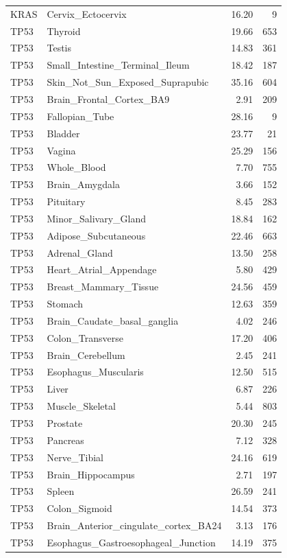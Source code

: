 \begin{footnotesize}
\begin{longtable}{llrr}
KRAS & Cervix\_Ectocervix & 16.20 & 9 \\
TP53 & Thyroid & 19.66 & 653 \\
TP53 & Testis & 14.83 & 361 \\
TP53 & Small\_Intestine\_Terminal\_Ileum & 18.42 & 187 \\
TP53 & Skin\_Not\_Sun\_Exposed\_Suprapubic & 35.16 & 604 \\
TP53 & Brain\_Frontal\_Cortex\_BA9 & 2.91 & 209 \\
TP53 & Fallopian\_Tube & 28.16 & 9 \\
TP53 & Bladder & 23.77 & 21 \\
TP53 & Vagina & 25.29 & 156 \\
TP53 & Whole\_Blood & 7.70 & 755 \\
TP53 & Brain\_Amygdala & 3.66 & 152 \\
TP53 & Pituitary & 8.45 & 283 \\
TP53 & Minor\_Salivary\_Gland & 18.84 & 162 \\
TP53 & Adipose\_Subcutaneous & 22.46 & 663 \\
TP53 & Adrenal\_Gland & 13.50 & 258 \\
TP53 & Heart\_Atrial\_Appendage & 5.80 & 429 \\
TP53 & Breast\_Mammary\_Tissue & 24.56 & 459 \\
TP53 & Stomach & 12.63 & 359 \\
TP53 & Brain\_Caudate\_basal\_ganglia & 4.02 & 246 \\
TP53 & Colon\_Transverse & 17.20 & 406 \\
TP53 & Brain\_Cerebellum & 2.45 & 241 \\
TP53 & Esophagus\_Muscularis & 12.50 & 515 \\
TP53 & Liver & 6.87 & 226 \\
TP53 & Muscle\_Skeletal & 5.44 & 803 \\
TP53 & Prostate & 20.30 & 245 \\
TP53 & Pancreas & 7.12 & 328 \\
TP53 & Nerve\_Tibial & 24.16 & 619 \\
TP53 & Brain\_Hippocampus & 2.71 & 197 \\
TP53 & Spleen & 26.59 & 241 \\
TP53 & Colon\_Sigmoid & 14.54 & 373 \\
TP53 & Brain\_Anterior\_cingulate\_cortex\_BA24 & 3.13 & 176 \\
TP53 & Esophagus\_Gastroesophageal\_Junction & 14.19 & 375 \\

\end{longtable}
\end{footnotesize}
